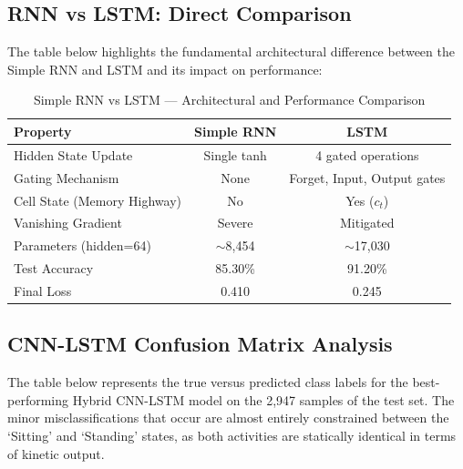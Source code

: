 \documentclass[12pt,a4paper]{article}
\begin{document}
\subsection{RNN vs LSTM: Direct Comparison}
The table below highlights the fundamental architectural difference between the Simple RNN and LSTM and its impact on performance:

\begin{table}[H]
\centering
\caption{Simple RNN vs LSTM --- Architectural and Performance Comparison}
\begin{tabular}{lcc}
\toprule
\textbf{Property} & \textbf{Simple RNN} & \textbf{LSTM} \\ \midrule
Hidden State Update & Single tanh & 4 gated operations \\
Gating Mechanism & None & Forget, Input, Output gates \\
Cell State (Memory Highway) & No & Yes ($c_t$) \\
Vanishing Gradient & Severe & Mitigated \\
Parameters (hidden=64) & $\sim$8,454 & $\sim$17,030 \\
Test Accuracy & 85.30\% & 91.20\% \\
Final Loss & 0.410 & 0.245 \\
\bottomrule
\end{tabular}
\end{table}

\subsection{CNN-LSTM Confusion Matrix Analysis}
The table below represents the true versus predicted class labels for the best-performing Hybrid CNN-LSTM model on the 2,947 samples of the test set. The minor misclassifications that occur are almost entirely constrained between the `Sitting' and `Standing' states, as both activities are statically identical in terms of kinetic output.
\end{document}
